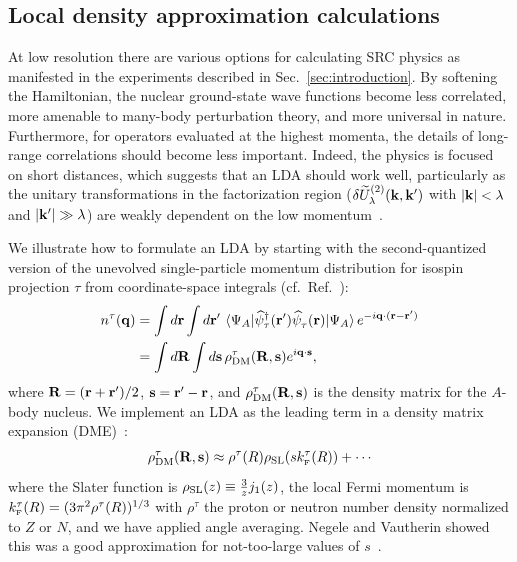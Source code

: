 \documentclass[10pt,aps,prc,floatfix,twocolumn,nofootinbib]{revtex4-1}
\begin{document}

\subsection{Local density approximation calculations}
  \label{subsec:LDA}
  
At low resolution there are various options for calculating SRC physics as manifested in the experiments described in Sec.~\ref{sec:introduction}.
By softening the Hamiltonian, the nuclear ground-state wave functions become less correlated, more amenable to many-body perturbation theory, and more universal in nature.
Furthermore, for operators evaluated at the highest momenta, the details of long-range correlations should become less important.
Indeed, the physics is focused on short distances, which suggests that an LDA should work well, particularly as the unitary transformations in the factorization region ($\delta \widetilde U^{(2)}_\lambda(\mathbf{k},\mathbf{k}')$ with $|\mathbf{k}| < \lambda$ and $|\mathbf{k}'|\gg \lambda$) are weakly dependent on the low momentum~\cite{Tropiano:2020zwb}.

We illustrate how to formulate an LDA by starting with the second-quantized version of the unevolved single-particle momentum distribution for isospin projection $\tau$ from coordinate-space integrals (cf.\ Ref.~\cite{Wiringa:2013ala}):
%
\begin{align} \label{eq:nk_from_dm}
    n^\tau(\mathbf{q}) &= \int d\mathbf{r} \int d\mathbf{r}' \,
     \mel{\Psi_A}{\widehat\psi^\dagger_\tau(\mathbf{r}')\widehat\psi^{\phantom{\dagger}}_\tau(\mathbf{r})}{\Psi_A}
      e^{-i\mathbf{q}\cdot(\mathbf{r} - \mathbf{r}')}  \notag \\
     &= \int d\mathbf{R} \int d\mathbf{s} \,
     \rho_{\rm DM}^\tau(\mathbf{R},\mathbf{s}) e^{i\mathbf{q}\cdot\mathbf{s}},
\end{align}
%
where $\mathbf{R} = (\mathbf{r} + \mathbf{r}')/2$, $\mathbf{s} = \mathbf{r}' - \mathbf{r}$,
and $\rho_{\rm DM}^\tau(\mathbf{R},\mathbf{s})$ is the density matrix for the $A$-body nucleus.
We implement an LDA as the leading term in a density matrix expansion (DME)~\cite{Negele:1972zp}:
%
\begin{align} \label{eq:dme}
    \rho_{\rm DM}^\tau(\mathbf{R},\mathbf{s}) \approx \rho^\tau(R) \rho_{\rm SL}(s k_{\scriptscriptstyle{\text F}}^\tau(R)) + \cdots
\end{align}
where the Slater function is $\rho_{\rm SL}(z) \equiv \frac{3}{z}j_1(z)$, the local Fermi momentum is $k_{\scriptscriptstyle{\text F}}^\tau(R) = (3\pi^2\rho^\tau(R))^{1/3}$ with $\rho^\tau$ the proton or neutron number density normalized to $Z$ or $N$, and we have applied angle averaging.
Negele and Vautherin showed this was a good approximation for not-too-large values of $s$~\cite{Negele:1972zp}.
\end{document}
